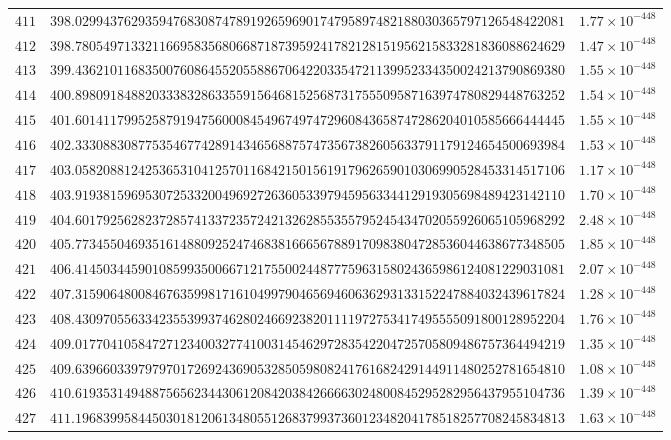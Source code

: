 \documentclass[12pt,reqno]{amsart}
\theoremstyle{remark}
\begin{document}
\begin{longtable}{clc}
$411$ & $398.0299437629359476830874789192659690174795897482188030365797126548422081$ & $1.77\times 10^{-448}$ \\
$412$ & $398.7805497133211669583568066871873959241782128151956215833281836088624629$ & $1.47\times 10^{-448}$ \\
$413$ & $399.4362101168350076086455205588670642203354721139952334350024213790869380$ & $1.55\times 10^{-448}$ \\
$414$ & $400.8980918488203338328633559156468152568731755509587163974780829448763252$ & $1.54\times 10^{-448}$ \\
$415$ & $401.6014117995258791947560008454967497472960843658747286204010585666444445$ & $1.55\times 10^{-448}$ \\
$416$ & $402.3330883087753546774289143465688757473567382605633791179124654500693984$ & $1.53\times 10^{-448}$ \\
$417$ & $403.0582088124253653104125701168421501561917962659010306990528453314517106$ & $1.17\times 10^{-448}$ \\
$418$ & $403.9193815969530725332004969272636053397945956334412919305698489423142110$ & $1.70\times 10^{-448}$ \\
$419$ & $404.6017925628237285741337235724213262855355795245434702055926065105968292$ & $2.48\times 10^{-448}$ \\
$420$ & $405.7734550469351614880925247468381666567889170983804728536044638677348505$ & $1.85\times 10^{-448}$ \\
$421$ & $406.4145034459010859935006671217550024487775963158024365986124081229031081$ & $2.07\times 10^{-448}$ \\
$422$ & $407.3159064800846763599817161049979046569460636293133152247884032439617824$ & $1.28\times 10^{-448}$ \\
$423$ & $408.4309705563342355399374628024669238201111972753417495555091800128952204$ & $1.76\times 10^{-448}$ \\
$424$ & $409.0177041058472712340032774100314546297283542204725705809486757364494219$ & $1.35\times 10^{-448}$ \\
$425$ & $409.6396603397979701726924369053285059808241761682429144911480252781654810$ & $1.08\times 10^{-448}$ \\
$426$ & $410.6193531494887565623443061208420384266663024800845295282956437955104736$ & $1.39\times 10^{-448}$ \\
$427$ & $411.1968399584450301812061348055126837993736012348204178518257708245834813$ & $1.63\times 10^{-448}$ \\

\end{longtable}
\end{document}
